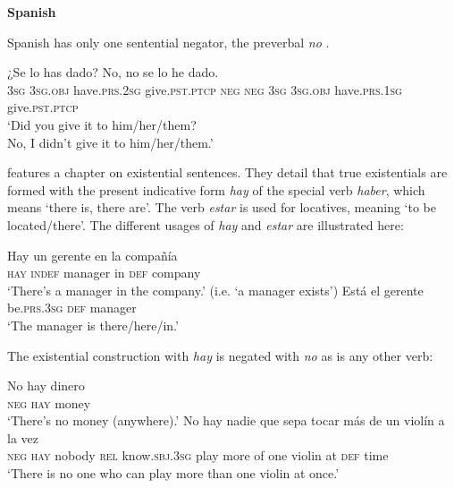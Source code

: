 ﻿\documentclass[output=paper]{langsci/langscibook}
\begin{document}
\begin{unindented}
\textbf{Spanish}

Spanish has only one sentential negator, the preverbal \textit{no}
\parencite[319ff]{ButtBenjamin1994}. 
%
\begin{exe}\ex \gll
¿Se lo has dado?\hspace{2.5in}
No, no se lo he dado.
\\
\textsc{3sg} \textsc{3sg.obj} have.\textsc{prs.2sg} give.\textsc{pst.ptcp}
\textsc{neg} \textsc{neg} \textsc{3sg} \textsc{3sg.obj} have.\textsc{prs.1sg} give.\textsc{pst.ptcp}
        \\
    \glt
‘Did you give it to him/her/them?\\
No, I didn’t give it to him/her/them.' \parencite[320]{ButtBenjamin1994}
    \end{exe}

\textcite[382ff]{ButtBenjamin1994} features a chapter on existential
sentences. They detail that true existentials are formed with the present
indicative form \textit{hay} of the special verb \textit{haber}, which
means `there is, there are'. The verb \textit{estar} is used for locatives,
meaning `to be located\slash there'. The different usages of \textit{hay} and \textit{estar} are illustrated here:
%
\begin{exe}\ex \gll Hay un gerente en la compañía \\
\textsc{hay} \textsc{indef} manager in \textsc{def} company \\
    \glt `There's a manager in the company.' (i.e. `a manager exists')
\parencite[383]{ButtBenjamin1994}
\ex \gll Está el gerente \\
be.\textsc{prs.3sg} \textsc{def} manager \\
    \glt `The manager is there/here/in.' \parencite[383]{ButtBenjamin1994}
    \end{exe}

The existential construction with \textit{hay} is negated with \textit{no} as is any other verb:
%
\begin{exe}\ex \gll No hay dinero \\
\textsc{neg} \textsc{hay} money \\
    \glt `There's no money (anywhere).' \parencite[383]{ButtBenjamin1994}
\ex \gll No hay nadie que  sepa tocar más  de un violín a  la vez \\
\textsc{neg} \textsc{hay} nobody \textsc{rel} know.\textsc{sbj.3sg} play  more of  one violin at \textsc{def} time \\
    \glt `There is no one who can play more than one violin at once.'
\parencite[269]{ButtBenjamin1994}
    \end{exe}


\end{unindented}
\end{document}

